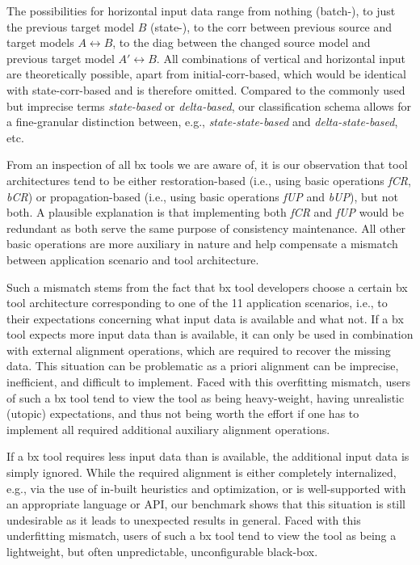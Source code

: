 The possibilities for horizontal input data range from nothing (batch-), to just the previous target model $B$ (state-), to the corr between previous source and target models $A \leftrightarrow B$, to the diag between the changed source model and previous target model $A' \leftrightarrow B$.
All combinations of vertical and horizontal input are theoretically possible, apart from initial-corr-based, which would be identical with state-corr-based and is therefore omitted.
Compared to the commonly used but imprecise terms \emph{state-based} or \emph{delta-based}, our classification schema allows for a fine-granular distinction between, e.g., \emph{state-state-based} and \emph{delta-state-based}, etc.

From an inspection of all bx tools we are aware of, it is our observation that tool architectures tend to be either restoration-based (i.e., using basic operations \emph{fCR}, \emph{bCR}) or propagation-based (i.e., using basic operations \emph{fUP} and \emph{bUP}), but not both.
A plausible explanation is that implementing both \emph{fCR} and \emph{fUP} would be redundant as both serve the same purpose of consistency maintenance.
All other basic operations are more auxiliary in nature and help compensate a mismatch between application scenario and tool architecture.

Such a mismatch stems from the fact that bx tool developers choose a certain bx tool architecture corresponding to one of the 11 application scenarios, i.e., to their expectations concerning what input data is available and what not.
If a bx tool expects more input data than is available, it can only be used in combination with external alignment operations, which are required to recover the missing data.
This situation can be problematic as a priori alignment can be imprecise, inefficient, and difficult to implement.
Faced with this overfitting mismatch, users of such a bx tool tend to view the tool as being heavy-weight, having unrealistic (utopic) expectations, and thus not being worth the effort if one has to implement all required additional auxiliary alignment operations.

If a bx tool requires less input data than is available, the additional input data is simply ignored.
While the required alignment is either completely internalized, e.g., via the use of in-built heuristics and optimization, or is well-supported with an appropriate language or API, our benchmark shows that this situation is still undesirable as it leads to unexpected results in general.
Faced with this underfitting mismatch, users of such a bx tool tend to view the tool as being a lightweight, but often unpredictable, unconfigurable black-box.

